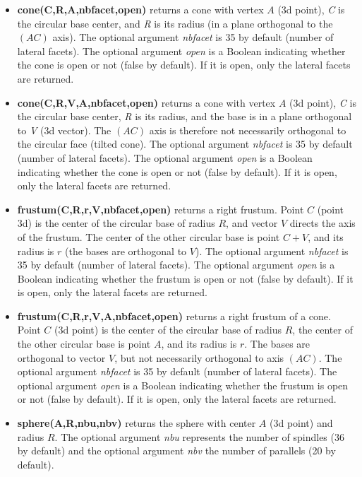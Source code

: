 \begin{itemize}
    \item \textbf{cone(C,R,A,nbfacet,open)} returns a cone with vertex $A$ (3d point), \emph{C} is the circular base center, and \emph{R} is its radius (in a plane orthogonal to the $(AC)$ axis). The optional argument \emph{nbfacet} is 35 by default (number of lateral facets). The optional argument \emph{open} is a Boolean indicating whether the cone is open or not (false by default). If it is open, only the lateral facets are returned.

    \item \textbf{cone(C,R,V,A,nbfacet,open)} returns a cone with vertex $A$ (3d point), \emph{C} is the circular base center, \emph{R} is its radius, and the base is in a plane orthogonal to \emph{V} (3d vector). The $(AC)$ axis is therefore not necessarily orthogonal to the circular face (tilted cone). The optional argument \emph{nbfacet} is 35 by default (number of lateral facets). The optional argument \emph{open} is a Boolean indicating whether the cone is open or not (false by default). If it is open, only the lateral facets are returned.

    \item \textbf{frustum(C,R,r,V,nbfacet,open)} returns a right frustum. Point $C$ (point 3d) is the center of the circular base of radius $R$, and vector $V$ directs the axis of the frustum. The center of the other circular base is point $C+V$, and its radius is $r$ (the bases are orthogonal to $V$). The optional argument \emph{nbfacet} is 35 by default (number of lateral facets). The optional argument \emph{open} is a Boolean indicating whether the frustum is open or not (false by default). If it is open, only the lateral facets are returned.

    \item \textbf{frustum(C,R,r,V,A,nbfacet,open)} returns a right frustum of a cone. Point $C$ (3d point) is the center of the circular base of radius $R$, the center of the other circular base is point $A$, and its radius is $r$. The bases are orthogonal to vector $V$, but not necessarily orthogonal to axis $(AC)$. The optional argument \emph{nbfacet} is 35 by default (number of lateral facets). The optional argument \emph{open} is a Boolean indicating whether the frustum is open or not (false by default). If it is open, only the lateral facets are returned.

    \item \textbf{sphere(A,R,nbu,nbv)} returns the sphere with center $A$ (3d point) and radius $R$. The optional argument \emph{nbu} represents the number of spindles (36 by default) and the optional argument \emph{nbv} the number of parallels (20 by default).
\end{itemize}

